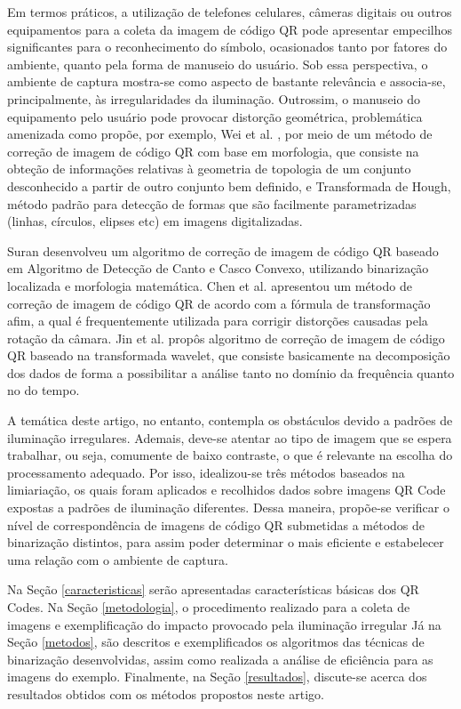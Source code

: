 \documentclass{ceel}
\begin{document}
\begin{multicols}{2}
Em termos práticos, a utilização de telefones celulares, câmeras digitais ou outros equipamentos para a coleta da imagem de código QR pode apresentar empecilhos significantes para o reconhecimento do símbolo, ocasionados tanto por fatores do ambiente, quanto pela forma de manuseio do usuário. Sob essa perspectiva, o ambiente de captura mostra-se como aspecto de bastante relevância e associa-se, principalmente, às irregularidades da iluminação. Outrossim, o manuseio do equipamento pelo usuário pode provocar distorção geométrica, problemática amenizada como propõe, por exemplo, 
Wei et al. \cite{jin-wei}, por meio de um método de correção de imagem
de código QR com base em morfologia, que consiste na obteção de informações relativas à geometria de topologia de um conjunto desconhecido a partir de outro conjunto bem definido, e Transformada de Hough, método padrão
para detecção de formas que são facilmente parametrizadas (linhas, círculos, elipses etc) em imagens digitalizadas.

Suran \cite{k-suran} desenvolveu um algoritmo de correção de imagem de código QR baseado em Algoritmo de Detecção de Canto e Casco
Convexo, utilizando binarização localizada e morfologia matemática. Chen et al. \cite{w-chen} apresentou um método de correção
de imagem de código QR de acordo com a fórmula de transformação afim, a qual é frequentemente utilizada para corrigir distorções causadas pela rotação da câmara. Jin et al. \cite{j-chen} propôs algoritmo de correção de
imagem de código QR baseado na transformada wavelet, que consiste basicamente na decomposição dos dados de forma a possibilitar a análise tanto no domínio da frequência quanto no do tempo.

A temática deste artigo, no entanto, contempla os obstáculos devido a padrões de iluminação irregulares. Ademais, deve-se atentar ao tipo de imagem que se espera trabalhar, ou seja, comumente de baixo contraste, o que é relevante na escolha do processamento adequado. Por isso, idealizou-se três métodos baseados na limiariação, os quais foram aplicados e recolhidos dados sobre imagens QR Code expostas a padrões de iluminação diferentes. Dessa maneira, propõe-se verificar o nível de correspondência de imagens de código QR submetidas a métodos de binarização distintos, para assim poder determinar o mais eficiente e estabelecer uma relação com o ambiente de captura.

Na Seção \ref{caracteristicas} serão apresentadas características básicas dos QR Codes. Na Seção \ref{metodologia}, o procedimento realizado para a coleta de imagens e exemplificação do impacto provocado pela iluminação irregular Já na Seção \ref{metodos}, são descritos e exemplificados os algoritmos das técnicas de binarização desenvolvidas, assim como realizada a análise de eficiência para as imagens do exemplo. Finalmente, na Seção \ref{resultados}, discute-se acerca dos resultados obtidos com os métodos propostos neste artigo.


\end{multicols}
\end{document}
